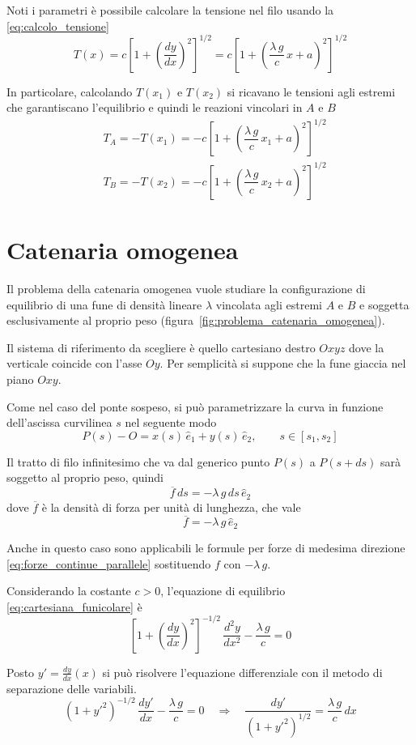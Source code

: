 Noti i parametri è possibile calcolare la tensione nel filo usando la \eqref{eq:calcolo_tensione}
\[
 T(x) = c\left[1+\left(\dfrac{dy}{dx}\right)^2\right]^{1/2} = c\left[1+\left(\dfrac{\lambda\,g}{c}\,x + a\right)^2\right]^{1/2}
\]

In particolare, calcolando $T(x_1)$ e $T(x_2)$ si ricavano le tensioni agli estremi che garantiscano l'equilibrio e quindi le reazioni vincolari in $A$ e $B$
\begin{align*}
 &T_A = -T(x_1) = -c\left[1+\left(\dfrac{\lambda\,g}{c}\,x_1 + a\right)^2\right]^{1/2}\\
 &T_B = -T(x_2) = -c\left[1+\left(\dfrac{\lambda\,g}{c}\,x_2 + a\right)^2\right]^{1/2}
 \end{align*}
 
 \section{Catenaria omogenea}
 
 Il problema della catenaria omogenea vuole studiare la configurazione di equilibrio di una fune di densità lineare $\lambda$ vincolata agli estremi $A$ e $B$ e soggetta esclusivamente al proprio peso (figura~\ref{fig:problema_catenaria_omogenea}). 
 
 Il sistema di riferimento da scegliere è quello cartesiano destro $Oxyz$ dove la verticale coincide con l'asse $Oy$. Per semplicità si suppone che la fune giaccia nel piano $Oxy$.
 
 Come nel caso del ponte sospeso, si può parametrizzare la curva in funzione dell'ascissa curvilinea $s$ nel seguente modo
 \[
  P(s) - O = x(s)\,\hat{e}_1 + y(s)\,\hat{e}_2,\qquad s\in[s_1, s_2]
 \]
 
Il tratto di filo infinitesimo che va dal generico punto $P(s)$ a $P(s+ds)$ sarà soggetto al proprio peso, quindi
\[
 \overline{f}\,ds = -\lambda\,g\,ds\,\hat{e}_2
\]
dove $\overline{f}$ è la densità di forza per unità di lunghezza, che vale
\[
 \overline{f} = -\lambda\,g\,\hat{e}_2
\]

Anche in questo caso sono applicabili le formule per forze di medesima direzione \eqref{eq:forze_continue_parallele} sostituendo $f$ con $-\lambda\,g$.

Considerando la costante $c>0$, l'equazione di equilibrio \eqref{eq:cartesiana_funicolare} è
\[
 \left[1+\left(\dfrac{dy}{dx}\right)^2\right]^{-1/2}\,\dfrac{d^2y}{dx^2} - \dfrac{\lambda\,g}{c} = 0
\]

Posto $y' = \frac{dy}{dx}(x)$ si può risolvere l'equazione differenziale con il metodo di separazione delle variabili.
\[
 \left(1+y'^2\right)^{-1/2}\,\dfrac{dy'}{dx} - \dfrac{\lambda\,g}{c} = 0 \quad \Longrightarrow\quad \dfrac{dy'}{\left(1+y'^2\right)^{1/2}} = \dfrac{\lambda\,g}{c}\,dx
\]

